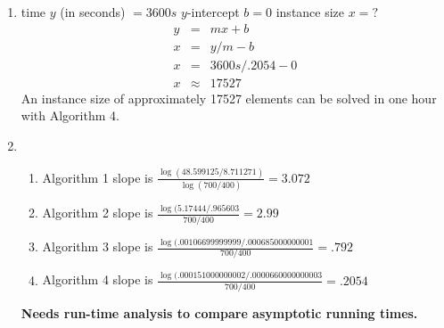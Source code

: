 \documentclass{article}
\begin{document}
\begin{enumerate}
\item 
time $y$ (in seconds) $= 3600s$\newline
$y$-intercept $b = 0$\newline
instance size $x = ?$
\begin{eqnarray*}
  \label{Extrapolation}
  y & = & mx+b \\
  x & = & y/m - b \\
  x & = & 3600s/.2054 - 0 \\
  x & \approx & 17527  
\end{eqnarray*}
An instance size of approximately 17527 elements can be solved in one hour with Algorithm 4.
\pagebreak 
\item \begin{enumerate}
\item Algorithm 1 slope is $\frac{\log(48.599125/8.711271)}{\log(700/400)} = 3.072$
\item Algorithm 2 slope is $\frac{\log(5.17444/.965603}{700/400} = 2.99$
\item Algorithm 3 slope is $\frac{\log(.00106699999999/.000685000000001}{700/400} = .792$
\item Algorithm 4 slope is $\frac{\log(.000151000000002/.0000660000000003}{700/400} = .2054$
\end{enumerate}
\textbf{Needs run-time analysis to compare asymptotic running times.}
\end{enumerate}
\end{document}
